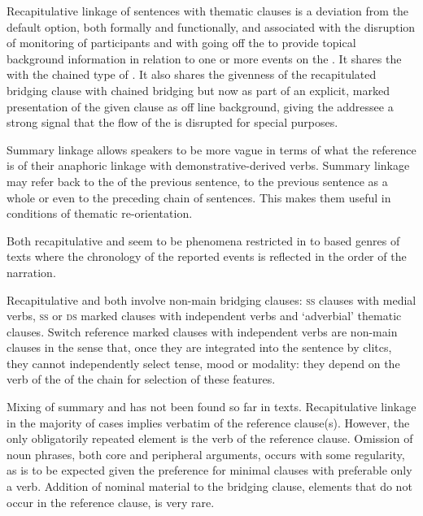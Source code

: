 \documentclass[output=paper]{LSP/langsci}
\begin{document}
Recapitulative linkage of sentences with thematic clauses is a deviation from the default option, both formally and functionally, and associated with the disruption of  monitoring of participants and with going off the  to provide topical background information in relation to one or more events on the . It shares the  with the chained type of . It also shares the givenness of the recapitulated bridging clause with chained bridging but now as part of an explicit, marked presentation of the given clause as off line background,  giving  the addressee a strong signal that the flow of the  is disrupted for special purposes.

Summary linkage allows speakers to be more vague in terms of what the reference is of their anaphoric linkage with demonstrative-derived verbs. Summary linkage may refer back to the  of the previous sentence, to the previous sentence as a whole or even to the preceding chain of sentences. This makes them useful in conditions of thematic re-orientation.

Both recapitulative and  seem to be phenomena restricted in  to  based genres of texts where the chronology of the reported events is reflected in the order of the narration. 

Recapitulative and  both involve non-main bridging clauses: \textsc{ss} clauses with medial verbs, \textsc{ss} or \textsc{ds} marked clauses with independent verbs and `adverbial' thematic clauses. Switch reference marked clauses with independent verbs are non-main clauses in the sense that, once they are integrated into the sentence by  clitcs, they cannot independently select tense, mood or modality: they depend on the verb of the  of the chain for selection of these features.

Mixing of summary and  has not been found so far in  texts. Recapitulative linkage in the majority of cases implies verbatim  of the reference clause(s). However, the only obligatorily repeated element is the verb of the reference clause. Omission of noun phrases, both core and peripheral arguments, occurs with some regularity, as is to be expected given the preference for minimal clauses with preferable only a verb. Addition of nominal material to the bridging clause, elements that do not occur in the reference clause, is very rare.
\end{document}
